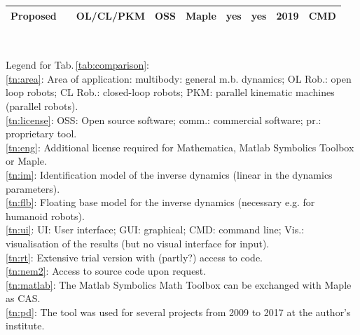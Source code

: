 \documentclass[runningheads]{llncs}
\newcommand{\ok}{{yes}}
\begin{document}
\begin{table}[b!]
\begin{tabular}[t]{|c|c|c|c|c|c|c|c|c|}
		\hline
		Proposed & & OL/CL/PKM & OSS & Maple & \ok & \ok & 2019 & CMD\\
		\hline
	\end{tabular}
	\\
	\vspace{0.2cm}
	\raggedright
	Legend for Tab.\,\ref{tab:comparison}:\\
	\ref{tn:area}: Area of application: multibody: general m.b. dynamics; OL Rob.: open loop robots; CL Rob.: closed-loop robots; PKM: parallel kinematic machines (parallel robots). \\
	\ref{tn:license}: OSS: Open source software; comm.: commercial software; pr.: proprietary tool. \\
	\ref{tn:eng}: Additional license required for Mathematica, Matlab Symbolics Toolbox or Maple. \\
	\ref{tn:im}: Identification model of the inverse dynamics (linear in the dynamics parameters). \\
	\ref{tn:flb}: Floating base model for the inverse dynamics (necessary e.g. for humanoid robots). \\
	\ref{tn:ui}: UI: User interface; GUI: graphical; CMD: command line; Vis.: visualisation of the results (but no visual interface for input).\\
	\ref{tn:rt}: Extensive trial version with (partly?) access to code. \\
	\ref{tn:nem2}: Access to source code upon request. \\
	\ref{tn:matlab}: The Matlab Symbolics Math Toolbox can be exchanged with Maple as CAS. \\
	\ref{tn:pd}: The tool was used for several projects from 2009 to 2017 at the author's institute. \\
\end{table} %
\end{document}
